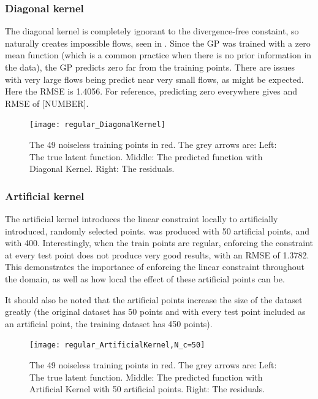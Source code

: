 \documentclass[12pt,a4paper,twoside]{report}
\theoremstyle{definition}
\begin{document}
\subsubsection{Diagonal kernel}
The diagonal kernel is completely ignorant to the divergence-free constaint, so naturally creates impossible flows, seen in . Since the GP was trained with a zero mean function (which is a common practice when there is no prior information in the data), the GP predicts zero far from the training points. There are issues with very large flows being predict near very small flows, as might be expected. Here the RMSE is 1.4056. For reference, predicting zero everywhere gives and RMSE of [NUMBER].

\begin{figure}[ht]
	\centering
	\texttt{[image: regular\_DiagonalKernel]}
	\caption{The 49 noiseless training points in red. The grey arrows are: Left: The true latent function. Middle: The predicted function with Diagonal Kernel. Right: The residuals.}
	\label{regdiag}
\end{figure}

\subsubsection{Artificial kernel}
The artificial kernel introduces the linear constraint locally to artificially introduced, randomly selected points.  was produced with 50 artificial points, and  with 400. Interestingly, when the train points are regular, enforcing the constraint at every test point does not produce very good results, with an RMSE of 1.3782. This demonstrates the importance of enforcing the linear constraint throughout the domain, as well as how local the effect of these artificial points can be.

It should also be noted that the artificial points increase the size of the dataset greatly (the original dataset has 50 points and with every test point included as an artificial point, the training dataset has 450 points).

\begin{figure}[ht]
	\centering
	\texttt{[image: regular\_ArtificialKernel,N\_c=50]}
	\caption{The 49 noiseless training points in red. The grey arrows are: Left: The true latent function. Middle: The predicted function with Artificial Kernel with 50 artificial points. Right: The residuals.}
	\label{regartif50}
\end{figure}
\end{document}
